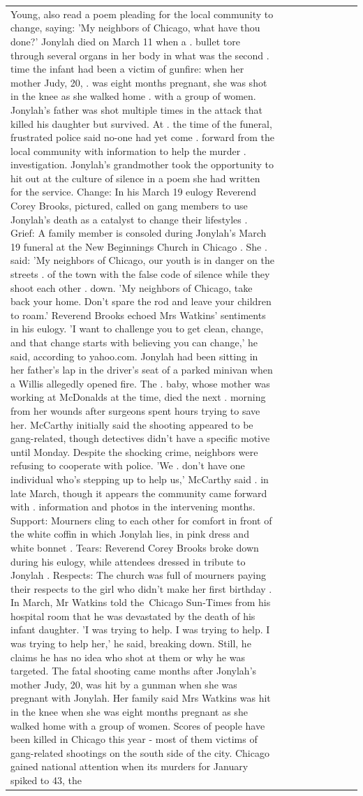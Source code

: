 \begin{table}[H]
\begin{tabular}{lllrlllll}
Young, also read a poem pleading for the local community to change, saying: 'My neighbors of Chicago, what have thou done?' Jonylah died on March 11 when a . bullet tore through several organs in her body in what was the second . time the infant had been a victim of gunfire: when her mother Judy, 20, . was eight months pregnant, she was shot in the knee as she walked home . with a group of women. Jonylah's father was shot multiple times in the attack that killed his daughter but survived. At . the time of the funeral, frustrated police said no-one had yet come . forward from the local community with information to help the murder . investigation. Jonylah's grandmother took the opportunity to hit out at the culture of silence in a poem she had written for the service. Change: In his March 19 eulogy Reverend Corey Brooks, pictured, called on gang members to use Jonylah's death as a catalyst to change their lifestyles . Grief: A family member is consoled during Jonylah's March 19 funeral at the New Beginnings Church in Chicago . She . said: 'My neighbors of Chicago, our youth is in danger on the streets . of the town with the false code of silence while they shoot each other . down. 'My neighbors of Chicago, take back your home. Don't spare the rod and leave your children to roam.' Reverend Brooks echoed Mrs Watkins' sentiments in his eulogy. 'I want to challenge you to get clean, change, and that change starts with believing you can change,' he said, according to yahoo.com. Jonylah had been sitting in her father's lap in the driver's seat of a parked minivan when a Willis allegedly opened fire. The . baby, whose mother was working at McDonalds at the time, died the next . morning from her wounds after surgeons spent hours trying to save her. McCarthy initially said the shooting appeared to be gang-related, though detectives didn't have a specific motive until Monday. Despite the shocking crime, neighbors were refusing to cooperate with police. 'We . don't have one individual who's stepping up to help us,' McCarthy said . in late March, though it appears the community came forward with . information and photos in the intervening months. Support: Mourners cling to each other for comfort in front of the white coffin in which Jonylah lies, in pink dress and white bonnet . Tears: Reverend Corey Brooks broke down during his eulogy, while attendees dressed in tribute to Jonylah . Respects: The church was full of mourners paying their respects to the girl who didn't make her first birthday . In March, Mr Watkins told the Chicago Sun-Times from his hospital room that he was devastated by the death of his infant daughter. 'I was trying to help. I was trying to help. I was trying to help her,' he said, breaking down. Still, he claims he has no idea who shot at them or why he was targeted. The fatal shooting came months after Jonylah's mother Judy, 20, was hit by a gunman when she was pregnant with Jonylah. Her family said Mrs Watkins was hit in the knee when she was eight months pregnant as she walked home with a group of women. Scores of people have been killed in Chicago this year - most of them victims of gang-related shootings on the south side of the city. Chicago gained national attention when its murders for January spiked to 43, the 
\end{tabular}
\end{table}

